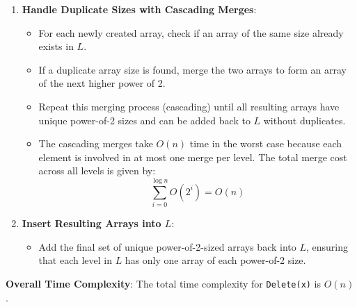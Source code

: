 \documentclass{article}
\begin{document}
\begin{enumerate}
    \item \textbf{Handle Duplicate Sizes with Cascading Merges}:
    \begin{itemize}
        \item For each newly created array, check if an array of the same size already exists in \( L \).
        \item If a duplicate array size is found, merge the two arrays to form an array of the next higher power of 2.
        \item Repeat this merging process (cascading) until all resulting arrays have unique power-of-2 sizes and can be added back to \( L \) without duplicates.
        \item The cascading merges take \( O(n) \) time in the worst case because each element is involved in at most one merge per level. The total merge cost across all levels is given by:
        \[
        \sum_{i=0}^{\log n} O(2^i) = O(n)
        \]
    \end{itemize}

    \item \textbf{Insert Resulting Arrays into \( L \)}:
    \begin{itemize}
        \item Add the final set of unique power-of-2-sized arrays back into \( L \), ensuring that each level in \( L \) has only one array of each power-of-2 size.
    \end{itemize}
\end{enumerate}

\textbf{Overall Time Complexity}: The total time complexity for \texttt{Delete(x)} is \( O(n) \).
\newpage
\end{document}
